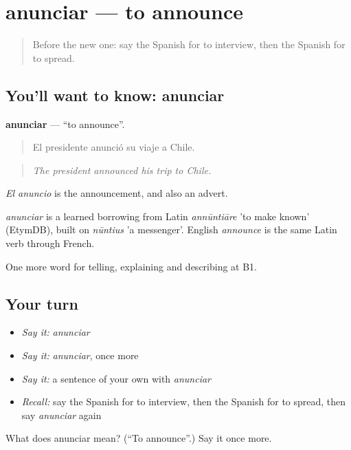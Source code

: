 \section[anunciar]{anunciar — to announce}

\label{lesson:ES-C514-anunciar}



\begin{quote}
Before the new one: say the Spanish for to interview, then the Spanish for to spread.
\end{quote}

\subsection*{You'll want to know: anunciar}
\textbf{anunciar} — \textquotedblleft{}to announce\textquotedblright{}.

\begin{quote}
El presidente anunció su viaje a Chile.
\end{quote}

\begin{quote}
\emph{The president announced his trip to Chile.}
\end{quote}

\emph{El anuncio} is the announcement, and also an advert.

\begin{cousinweb}
\emph{anunciar} is a learned borrowing from Latin \emph{annūntiāre} 'to make known' (EtymDB), built on \emph{nūntius} 'a messenger'. English \emph{announce} is the same Latin verb through French.
\end{cousinweb}

\begin{grammarlens}[title={What you've built}]
One more word for telling, explaining and describing at B1.
\end{grammarlens}

\subsection*{Your turn}
\begin{itemize}
\raggedright
  \item \emph{Say it:} \emph{anunciar}
  \item \emph{Say it:} \emph{anunciar}, once more
  \item \emph{Say it:} a sentence of your own with \emph{anunciar}
  \item \emph{Recall:} say the Spanish for to interview, then the Spanish for to spread, then say \emph{anunciar} again
\end{itemize}

\begin{tcolorbox}[breakable,colback=teal!4,colframe=teal!35!black,title={Before you move on}]
What does anunciar mean? (\textquotedblleft{}To announce\textquotedblright{}.) Say it once more.
\end{tcolorbox}
